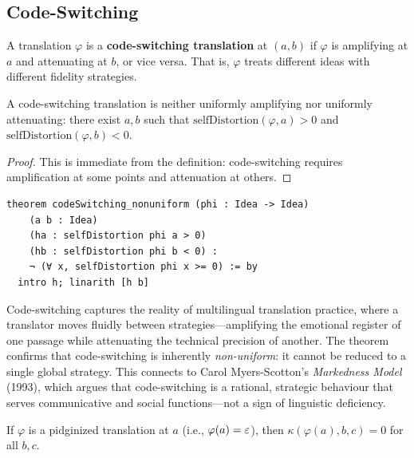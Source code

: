 \subsection{Code-Switching}

\begin{definition}
\label{def:code-switching}
A translation $\varphi$ is a \textbf{code-switching translation} at
$(a, b)$ if $\varphi$ is amplifying at $a$ and attenuating at $b$,
or vice versa.  That is, $\varphi$ treats different ideas with different
fidelity strategies.
\end{definition}

\begin{theorem}
\label{thm:code-switch-nonuniform}
A code-switching translation is neither uniformly amplifying nor uniformly
attenuating: there exist $a, b$ such that
$\mathrm{selfDistortion}(\varphi, a) > 0$ and
$\mathrm{selfDistortion}(\varphi, b) < 0$.
\end{theorem}

\begin{proof}
This is immediate from the definition: code-switching requires amplification
at some points and attenuation at others.
\end{proof}

\begin{lstlisting}
theorem codeSwitching_nonuniform (phi : Idea -> Idea)
    (a b : Idea)
    (ha : selfDistortion phi a > 0)
    (hb : selfDistortion phi b < 0) :
    ¬ (∀ x, selfDistortion phi x >= 0) := by
  intro h; linarith [h b]
\end{lstlisting}

\begin{interpretation}
\label{int:code-switch}
Code-switching captures the reality of multilingual translation practice,
where a translator moves fluidly between strategies---amplifying the
emotional register of one passage while attenuating the technical precision
of another.  The theorem confirms that code-switching is inherently
\emph{non-uniform}: it cannot be reduced to a single global strategy.
This connects to Carol Myers-Scotton's \emph{Markedness Model} (1993),
which argues that code-switching is a rational, strategic behaviour that
serves communicative and social functions---not a sign of linguistic
deficiency.
\end{interpretation}

\begin{theorem}
\label{thm:pidginized-emergence}
If $\varphi$ is a pidginized translation at $a$ (i.e., $\varphi(a) = \varepsilon$), then $\kappa(\varphi(a), b, c) = 0$ for all $b, c$.
\end{theorem}

